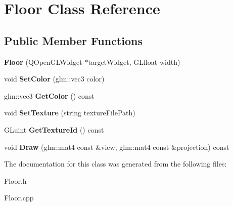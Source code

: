 \hypertarget{class_floor}{}\section{Floor Class Reference}
\label{class_floor}
\subsection*{Public Member Functions}
\begin{DoxyCompactItemize}
\item 
\hypertarget{class_floor_acd7d3bf0e838d5de06e973ac6310511b}{}{\bfseries Floor} (Q\+Open\+G\+L\+Widget $\ast$target\+Widget, G\+Lfloat width)\label{class_floor_acd7d3bf0e838d5de06e973ac6310511b}

\item 
\hypertarget{class_floor_a6d0e6150ba611e218d81af542c8e0196}{}void {\bfseries Set\+Color} (glm\+::vec3 color)\label{class_floor_a6d0e6150ba611e218d81af542c8e0196}

\item 
\hypertarget{class_floor_ad6022b618376adbf7087d5ccd3ea053d}{}glm\+::vec3 {\bfseries Get\+Color} () const \label{class_floor_ad6022b618376adbf7087d5ccd3ea053d}

\item 
\hypertarget{class_floor_a61a025433294398423351ecc560e467b}{}void {\bfseries Set\+Texture} (string texture\+File\+Path)\label{class_floor_a61a025433294398423351ecc560e467b}

\item 
\hypertarget{class_floor_ad1329cec2ad3a43d9418c6d4b98fe285}{}G\+Luint {\bfseries Get\+Texture\+Id} () const \label{class_floor_ad1329cec2ad3a43d9418c6d4b98fe285}

\item 
\hypertarget{class_floor_ac511f90a6e822dda5c9e3f2d40c5638f}{}void {\bfseries Draw} (glm\+::mat4 const \&view, glm\+::mat4 const \&projection) const \label{class_floor_ac511f90a6e822dda5c9e3f2d40c5638f}

\end{DoxyCompactItemize}


The documentation for this class was generated from the following files\+:\begin{DoxyCompactItemize}
\item 
Floor.\+h\item 
Floor.\+cpp\end{DoxyCompactItemize}
